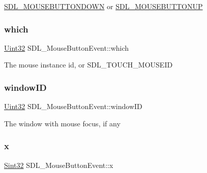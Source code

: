 \mbox{\hyperlink{_s_d_l__events_8h_a3b589e89be6b35c02e0dd34a55f3fccaa9267166e1536dfa8b0daa98c0afa9052}{S\+D\+L\+\_\+\+M\+O\+U\+S\+E\+B\+U\+T\+T\+O\+N\+D\+O\+WN}} or \mbox{\hyperlink{_s_d_l__events_8h_a3b589e89be6b35c02e0dd34a55f3fccaa4ab85278398d29b9e50f500aad2b952b}{S\+D\+L\+\_\+\+M\+O\+U\+S\+E\+B\+U\+T\+T\+O\+N\+UP}} \mbox{\label{struct_s_d_l___mouse_button_event_a366aef59a0f393afc8a3561e741825df}} 
\subsubsection{\texorpdfstring{which}{which}}
{\footnotesize\ttfamily \mbox{\hyperlink{_s_d_l__stdinc_8h_add440eff171ea5f55cb00c4a9ab8672d}{Uint32}} S\+D\+L\+\_\+\+Mouse\+Button\+Event\+::which}

The mouse instance id, or S\+D\+L\+\_\+\+T\+O\+U\+C\+H\+\_\+\+M\+O\+U\+S\+E\+ID \mbox{\label{struct_s_d_l___mouse_button_event_ab3b855d4b543b5d02fcf5d56e4421393}} 
\subsubsection{\texorpdfstring{window\+ID}{windowID}}
{\footnotesize\ttfamily \mbox{\hyperlink{_s_d_l__stdinc_8h_add440eff171ea5f55cb00c4a9ab8672d}{Uint32}} S\+D\+L\+\_\+\+Mouse\+Button\+Event\+::window\+ID}

The window with mouse focus, if any \mbox{\label{struct_s_d_l___mouse_button_event_a5bb9c61b86e999f58637511e32e3a076}} 
\subsubsection{\texorpdfstring{x}{x}}
{\footnotesize\ttfamily \mbox{\hyperlink{_s_d_l__stdinc_8h_a7a90b941db9d4582e9ad7abb9940ff7e}{Sint32}} S\+D\+L\+\_\+\+Mouse\+Button\+Event\+::x}

